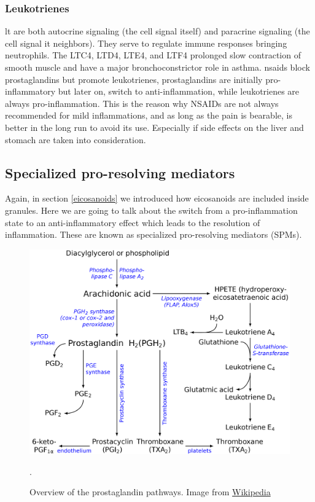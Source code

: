 \subsubsection{Leukotrienes}
\label{in:lt}

\gls{lt} are both autocrine signaling (the cell signal itself) and paracrine signaling (the cell signal it neighbors). They serve to regulate immune responses bringing neutrophils. The LTC4, LTD4, LTE4, and LTF4 prolonged slow contraction of smooth muscle and have a major bronchoconstrictor role in asthma. \gls{nsaids} block prostaglandins but promote leukotrienes, prostaglandins are initially pro-inflammatory but later on, switch to anti-inflammation, while leukotrienes are always pro-inflammation. This is the reason why NSAIDs are not always recommended for mild inflammations, and as long as the pain is bearable, is better in the long run to avoid its use. Especially if side effects on the liver and stomach are taken into consideration.

\subsection{Specialized pro-resolving mediators}
\label{arcachonidacids}
\label{in:spm}

Again, in section \ref{eicosanoids} we introduced how eicosanoids are included inside granules. Here we are going to talk about the switch from a pro-inflammation state to an anti-inflammatory effect which leads to the resolution of inflammation. These are known as specialized pro-resolving mediators (SPMs).

        \begin{figure}[h!]
            \centering
                \includegraphics[width=0.7\linewidth]{figures/Inflammation/2560px-Eicosanoid_synthesis.svg.png} 
            \caption{Overview of the prostaglandin pathways. Image from \href{https://en.wikipedia.org/wiki/File:Eicosanoid_synthesis.svg}{Wikipedia}}.
            \label{figure:Phell}
        \end{figure}  


